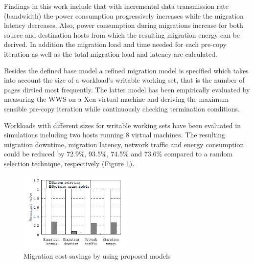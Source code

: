 Findings in this work include that with incremental data transmission rate (bandwidth) the power consumption progressively increases while the migration latency decreases. Also, power consumption during migrations increase for both source and destination hosts from which the resulting migration energy can be derived. In addition the migration load and time needed for each pre-copy iteration as well as the total migration load and latency are calculated. 

Besides the defined base model a refined migration model is specified which takes into account the size of a workload's writable working set, that is the number of pages dirtied most frequently. The latter model has been empirically evaluated by measuring the WWS on a Xen virtual machine and deriving the maximum sensible pre-copy iteration while continuously checking termination conditions. 

Workloads with different sizes for writable working sets have been evaluated in simulations including two hosts running 8 virtual machines. 
The resulting migration downtime, migration latency, network traffic and energy consumption could be reduced by 72.9\%, 93.5\%, 74.5\% and 73.6\% compared to a random selection technique, respectively (Figure \ref{fig:vm_migration_normalized_cost}). 

\begin{figure}[htbp]
	\centering
		\includegraphics[width=0.5\textwidth]{figures/state_of_the_art/vm_migration_normalized_cost.PNG}
	\caption{Migration cost savings by using proposed models \cite{liu2013performance}}
	\label{fig:vm_migration_normalized_cost}
\end{figure}












